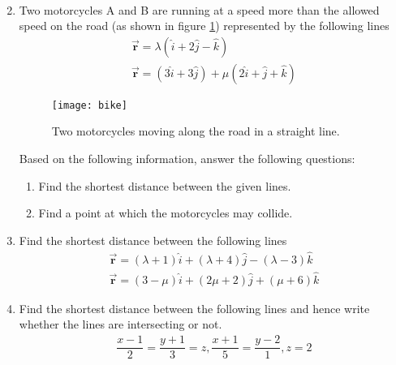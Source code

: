 \begin{enumerate}
\begin{align}
	\end{align}
\item Two motorcycles A and B are running at a speed more than the allowed speed on the road (as shown in figure \ref{fig:bike1}) represented by the following lines 
	\begin{align}
		&\overrightarrow{\textbf{r}}=\lambda(\hat{i}+2\hat{j}-\hat{k})&\\&\overrightarrow{\textbf{r}}=(3\hat{i}+3\hat{j})+\mu(2\hat{i}+\hat{j}+\hat{k})&
	\end{align}
	\begin{figure}[H]
		\centering
		\texttt{[image: bike]}
		\caption{Two motorcycles moving along the road in a straight line.}
		\label{fig:bike1}
	\end{figure}
	Based on the following information, answer the following questions:
	\begin{enumerate}
		\item Find the shortest distance between the given lines.
		\item Find a point at which the motorcycles may collide.
	\end{enumerate}
\item Find the shortest distance between the following lines
	\begin{align}
		&\overrightarrow{\textbf{r}}=(\lambda+1)\hat{i}+(\lambda+4)\hat{j}-(\lambda-3)\hat{k}&\\&\overrightarrow{\textbf{r}}=(3-\mu)\hat{i}+(2\mu+2)\hat{j}+(\mu+6)\hat{k}&
	\end{align}
\item Find the shortest distance between the following lines and hence write whether the lines are intersecting or not.
	\begin{align}
		\dfrac{x-1}{2}=\dfrac{y+1}{3}=z, \dfrac{x+1}{5}=\dfrac{y-2}{1}, z=2
	\end{align}
\end{enumerate}
%
